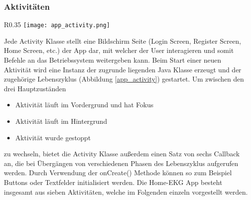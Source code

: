 \subsubsection{Aktivitäten}
\begin{wrapfigure}[11]{R}{0.35\textwidth}
\vspace{-25pt}
\texttt{[image: app\_activity.png]}
\caption{Lifecycle}
\label{app_activity}
\end{wrapfigure} 
Jede Activity Klasse stellt eine Bildschirm Seite (Login Screen, Register Screen, Home Screen, etc.) der App dar, mit welcher der User interagieren und somit Befehle an das Betriebssystem weitergeben kann. Beim Start einer neuen Aktivität wird eine Instanz der zugrunde liegenden Java Klasse erzeugt und der zugehörige Lebenszyklus (Abbildung \ref{app_activity}) gestartet.
Um zwischen den drei Hauptzuständen
\begin{itemize}
\item[•] Aktivität läuft im Vordergrund und hat Fokus
\item[•] Aktivität läuft im Hintergrund
\item[•] Aktivität wurde gestoppt
\end{itemize}
zu wechseln, bietet die Activity Klasse außerdem einen Satz von sechs Callback an, die bei Übergängen von verschiedenen Phasen des Lebenszyklus aufgerufen werden. Durch Verwendung der onCreate() Methode können so zum Beispiel Buttons oder Textfelder initialisiert werden.
Die Home-EKG App besteht insgesamt aus sieben Aktivitäten, welche im Folgenden einzeln vorgestellt werden.

